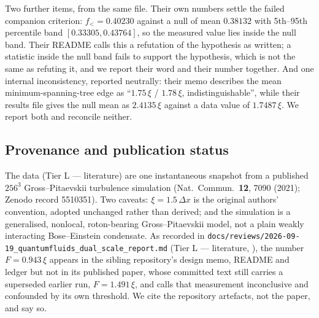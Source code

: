 \documentclass[11pt,a4paper]{article}
\theoremstyle{remark}
\newcommand{\tierL}{\colorbox{blue!10}{\textsf{\scriptsize Tier L --- literature}}}
\newcommand{\lean}[1]{\texttt{#1}}
\begin{document}
Two further items, from the same file. Their own numbers settle the failed companion criterion: $f_< = 0.40230$ against a null of mean $0.38132$ with 5th--95th percentile band $[0.33305,0.43764]$, so the measured value lies inside the null band. Their README calls this a refutation of the hypothesis as written; a statistic inside the null band fails to support the hypothesis, which is not the same as refuting it, and we report their word and their number together. And one internal inconsistency, reported neutrally: their memo describes the mean minimum-spanning-tree edge as ``$1.75\,\xi$ / $1.78\,\xi$, indistinguishable'', while their results file gives the null mean as $2.4135\,\xi$ against a data value of $1.7487\,\xi$. We report both and reconcile neither.

\subsection*{Provenance and publication status}

The data (\tierL) are one instantaneous snapshot from a published $256^3$ Gross--Pitaevskii turbulence simulation \cite{Polanco2021} (Nat.\ Commun.\ \textbf{12}, 7090 (2021); Zenodo record 5510351). Two caveats: $\xi = 1.5\,\Delta x$ is the original authors' convention, adopted unchanged rather than derived; and the simulation is a generalised, nonlocal, roton-bearing Gross--Pitaevskii model, not a plain weakly interacting Bose--Einstein condensate. As recorded in \lean{docs/reviews/2026-09-19\_quantumfluids\_dual\_scale\_report.md} (\tierL, \cite{QuantumFluids2026}), the number $F = 0.943\,\xi$ appears in the sibling repository's design memo, README and ledger but not in its published paper, whose committed text still carries a superseded earlier run, $F = 1.491\,\xi$, and calls that measurement inconclusive and confounded by its own threshold. We cite the repository artefacts, not the paper, and say so.
\end{document}
